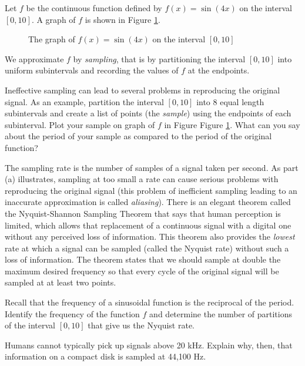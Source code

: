 \begin{exercises}

Let $f$ be the continuous function defined by $f(x) = \sin(4x)$ on the interval $[0,10]$. A graph of $f$ is shown in Figure \ref{F:8.1.PA1}.
\begin{figure}[h]
\begin{center}
\caption{The graph of $f(x) = \sin(4x)$ on the interval $[0,10]$}
\label{F:8.1.PA1}
\end{center}
\end{figure}
We approximate $f$ by \emph{sampling}, that is by partitioning the interval $[0,10]$ into uniform subintervals and recording the values of $f$ at the endpoints.
    \ba
	\item Ineffective sampling can lead to several problems in reproducing the original signal. As an example, partition the interval $[0,10]$ into 8 equal length subintervals and create a list of points (the \emph{sample}) using the endpoints of each subinterval. Plot your sample on graph of $f$ in Figure Figure \ref{F:8.1.PA1}. What can you say about the period of your sample as compared to the period of the original function?

    \item The sampling rate is the number of samples of a signal taken per second. As part (a) illustrates, sampling at too small a rate can cause serious problems with reproducing the original signal (this problem of inefficient sampling leading to an inaccurate approximation is called \emph{aliasing}). There is an elegant  theorem called the Nyquist-Shannon Sampling Theorem that says that human perception is limited, which allows that replacement of a continuous signal with a digital one without any perceived loss of information. This theorem also provides the \emph{lowest} rate at which a signal can be sampled (called the Nyquist rate) without such a loss of information. The theorem states that we should sample at double the maximum desired frequency so that every cycle of the original signal will be sampled at at least two points.

        Recall that the frequency of a sinusoidal function is the reciprocal of the period. Identify the frequency of the function $f$ and determine the number of partitions of the interval $[0,10]$ that give us the Nyquist rate.

    \item Humans cannot typically pick up signals above 20 kHz. Explain why, then, that information on a compact disk is sampled at 44,100 Hz.


    \ea


\end{exercises}
\afterexercises
